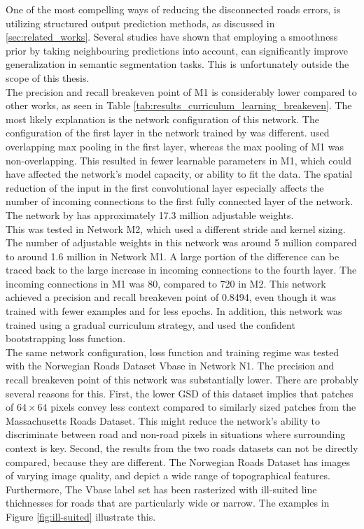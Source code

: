 One of the most compelling ways of reducing the disconnected roads errors, is utilizing structured output prediction methods, as discussed in \ref{sec:related_works}. Several studies \citep{Kluckner_semantic_height} \citep{LeCun_semantic} \citep{Mnih_roads_high_res_aerial_images} have shown that employing a smoothness prior by taking neighbouring predictions into account, can significantly improve generalization in semantic segmentation tasks. This is unfortunately outside the scope of this thesis.\\

The precision and recall breakeven point of M1 is considerably lower compared to other works, as seen in Table \ref{tab:results_curriculum_learning_breakeven}. The most likely explanation is the network configuration of this network. The configuration of the first layer in the network trained by \citep{MnihThesis} was different. \citep{MnihThesis} used overlapping max pooling in the first layer, whereas the max pooling of M1 was non-overlapping. This resulted in fewer learnable parameters in M1, which could have affected the network's model capacity, or ability to fit the data. The spatial reduction of the input in the first convolutional layer especially affects the number of incoming connections to the first fully connected layer of the network.  The network by \cite{MnihThesis} has approximately 17.3 million adjustable weights.\\

This was tested in Network M2, which used a different stride and kernel sizing. The number of adjustable weights in this network was around 5 million compared to around 1.6 million in Network M1. A large portion of the difference can be traced back to the large increase in incoming connections to the fourth layer. The incoming connections in M1 was 80, compared to 720 in M2. This network achieved a precision and recall breakeven point of 0.8494, even though it was trained with fewer examples and for less epochs. In addition, this network was trained using a gradual curriculum strategy, and used the confident bootstrapping loss function. \\

The same network configuration, loss function and training regime was tested with the Norwegian Roads Dataset Vbase in Network N1. The precision and recall breakeven point of this network was substantially lower. There are probably several reasons for this. First, the lower \ac{GSD} of this dataset implies that patches of $64 \times 64$ pixels convey less context compared to similarly sized patches from the Massachusetts Roads Dataset. This might reduce the network's ability to discriminate between road and non-road pixels in situations where surrounding context is key. Second, the results from the two roads datasets can not be directly compared, because they are different. The Norwegian Roads Dataset has images of varying image quality, and depict a wide range of topographical features. Furthermore, The Vbase label set has been rasterized with ill-suited line thichnesses for roads that are particularly wide or narrow. The examples in Figure \ref{fig:ill-suited} illustrate this. 

